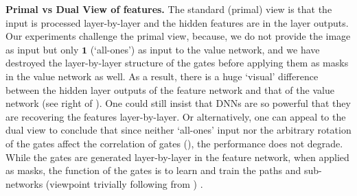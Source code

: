 
\textbf{Primal vs Dual View of features.} The standard (primal) view is that the input is processed layer-by-layer and the hidden features are in the layer outputs. 
Our experiments challenge the primal view, because, 
we do not provide the image as input but only $\mathbf{1}$ (`all-ones') as input to the value network, and we have destroyed the layer-by-layer structure of the gates before applying them as masks in the value network as well.  As a result, there is a huge `visual' difference between the hidden layer outputs of the feature network and that of the value network (see right of ).  One could still insist that DNNs are so powerful that they are recovering the features layer-by-layer. Or alternatively, one can appeal to the dual view to conclude that since neither `all-ones' input nor the arbitrary rotation of the gates affect the correlation of gates (), the performance does not degrade. While the gates are generated layer-by-layer in the feature network, when applied as masks, the function of the gates is to learn and train the paths and sub-networks (viewpoint trivially following from ) .

